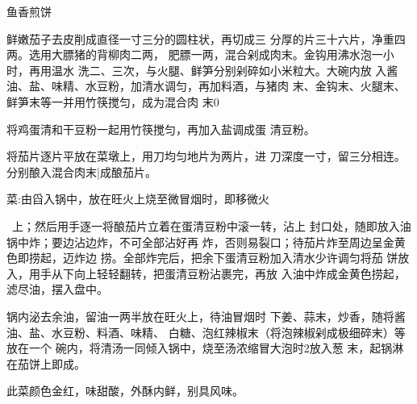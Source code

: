 \begin{recipe}{鱼香煎饼}

\ingredients


\cooking

\step 鲜嫩茄子去皮削成直径一寸三分的圆柱状，再切成三 分厚的片三十六片，净重四两。选用大膘猪的背柳肉二两， 肥膘一两，混合剁成肉末。金钩用沸水泡一小时，再用温水 洗二、三次，与火腿、鲜笋分别剁碎如小米粒大。大碗内放 入酱油、盐、味精、水豆粉，加清水调匀，再加料酒，与猪肉 末、金钩末、火腿末、鲜笋末等一并用竹筷搅匀，成为混合肉 末0

将鸡蛋清和干豆粉一起用竹筷搅匀，再加入盐调成蛋 清豆粉。

\step 	将茄片逐片平放在菜墩上，用刀均匀地片为两片，进 刀深度一寸，留三分相连。分别酿入混合肉末|成酿茄片。

\step 	菜:由舀入锅中，放在旺火上烧至微冒烟时，即移微火

~上；然后用手逐一将酿茄片立着在蛋清豆粉中滚一转，沾上 封口处，随即放入油锅中炸；要边沾边炸，不可全部沾好再 炸，否则易裂口；待茄片炸至周边呈金黄色即捞起，迈炸边 捞。全部炸完后，把余下蛋清豆粉加入清水少许调匀将茄 饼放入，用手从下向上轻轻翻转，把蛋清豆粉沾裹完，再放 入油中炸成金黄色捞起，滤尽油，摆入盘中。

\step 锅内泌去余油，留油一两半放在旺火上，待油冒烟时 下姜、蒜末，炒香，随将酱油、盐、水豆粉、料酒、味精、 白糖、泡红辣椒末（将泡辣椒剁成极细碎末）等放在一个 碗内，将清汤一同倾入锅中，烧至汤浓缩冒大泡时2放入葱 末，起锅淋在茄饼上即成。

\notes

此菜颜色金红，味甜酸，外酥内鲜，别具风味。

\end{recipe}

